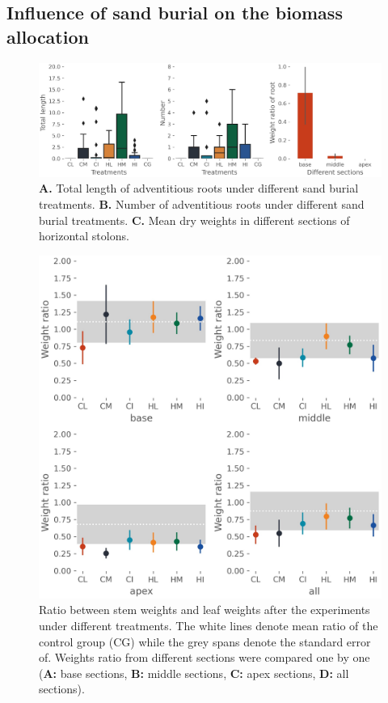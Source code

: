 \documentclass[]{interact}
\theoremstyle{plain}%
\theoremstyle{definition}
\theoremstyle{remark}
\begin{document}
\subsection{Influence of sand burial on the biomass allocation}
\begin{figure}
  \centering
  \includegraphics[scale=0.6]{../figs/roots.jpg}
  \caption{
    \textbf{A.} Total length of adventitious roots under different sand burial treatments.
    \textbf{B.} Number of adventitious roots under different sand burial treatments.
    \textbf{C.} Mean dry weights in different sections of horizontal stolons.
  }
  \label{fig:roots}
\end{figure}

\begin{figure}
  \centering
  \includegraphics[scale=0.8]{../figs/ratio.jpg}
  \caption{
    Ratio between stem weights and leaf weights after the experiments under different treatments. The white lines denote mean ratio of the control group (CG) while the grey spans denote the standard error of. Weights ratio from different sections were compared one by one (\textbf{A:} base sections, \textbf{B:} middle sections, \textbf{C:} apex sections, \textbf{D:} all sections).
  }
  \label{fig:ratio}
\end{figure}
\end{document}
